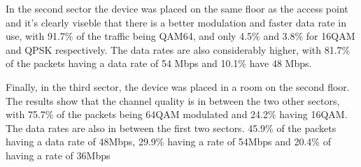 \documentclass[12]{article}
\begin{document}
In the second sector the device was placed on the same floor as the access point and it's clearly viseble that there is a better modulation and faster data rate in use, with 91.7\% of the traffic being QAM64, and only 4.5\% and 3.8\% for 16QAM and QPSK respectively. The data rates are also considerably higher, with 81.7\% of the packets having a data rate of 54 Mbps and 10.1\% have 48 Mbps.

Finally, in the third sector, the device was placed in a room on the second floor. The results show that the channel quality is in between the two other sectors, with 75.7\% of the packets being 64QAM modulated and 24.2\% having 16QAM. The data rates are also in between the first two sectors. 45.9\% of the packets having a data rate of 48Mbps, 29.9\% having a rate of 54Mbps and 20.4\% of having a rate of 36Mbps
\end{document}
